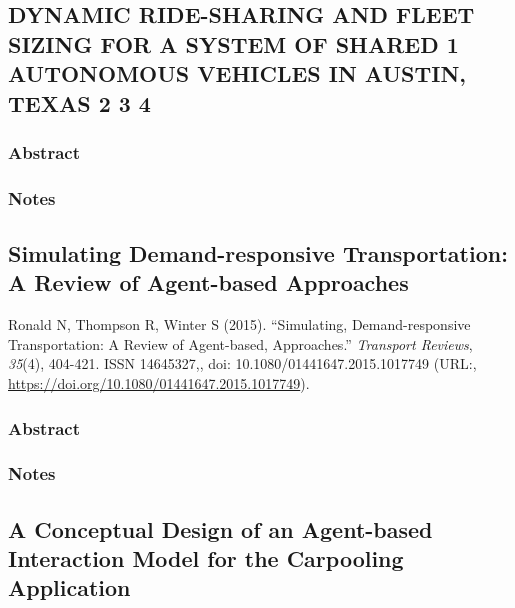 \documentclass[]{article}
\begin{document}
\hypertarget{dynamic-ride-sharing-and-fleet-sizing-for-a-system-of-shared-1-autonomous-vehicles-in-austin-texas-2-3-4}{%
\subsection{DYNAMIC RIDE-SHARING AND FLEET SIZING FOR A SYSTEM OF SHARED
1 AUTONOMOUS VEHICLES IN AUSTIN, TEXAS 2 3
4}\label{dynamic-ride-sharing-and-fleet-sizing-for-a-system-of-shared-1-autonomous-vehicles-in-austin-texas-2-3-4}}

\hypertarget{abstract-17}{%
\subsubsection{Abstract}\label{abstract-17}}

\hypertarget{notes-17}{%
\subsubsection{Notes}\label{notes-17}}

\hypertarget{simulating-demand-responsive-transportation-a-review-of-agent-based-approaches}{%
\subsection{Simulating Demand-responsive Transportation: A Review of
Agent-based
Approaches}\label{simulating-demand-responsive-transportation-a-review-of-agent-based-approaches}}

Ronald N, Thompson R, Winter S (2015). ``Simulating, Demand-responsive
Transportation: A Review of Agent-based, Approaches.'' \emph{Transport
Reviews}, \emph{35}(4), 404-421. ISSN 14645327,, doi:
10.1080/01441647.2015.1017749 (URL:,
\url{https://doi.org/10.1080/01441647.2015.1017749}).

\hypertarget{abstract-18}{%
\subsubsection{Abstract}\label{abstract-18}}

\hypertarget{notes-18}{%
\subsubsection{Notes}\label{notes-18}}

\hypertarget{a-conceptual-design-of-an-agent-based-interaction-model-for-the-carpooling-application}{%
\subsection{A Conceptual Design of an Agent-based Interaction Model for
the Carpooling
Application}\label{a-conceptual-design-of-an-agent-based-interaction-model-for-the-carpooling-application}}
\end{document}
